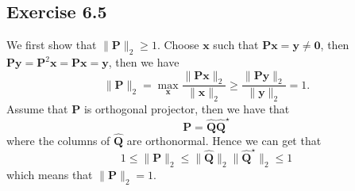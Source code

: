 \documentclass{article}
\begin{document}
\subsection{Exercise 6.5}
We first show that $\| \bm{P} \|_2 \geq 1$. Choose $\bm{x}$ such that $ \bm{Px} = \bm{y} \neq \bm{0}$, then $ \bm{P} \bm{y} = \bm{P}^2 \bm{x} = \bm{P} \bm{x} = \bm{y}$, then we have
$$
\| \bm{P} \|_2 = \max_{\bm{x} }  \frac{\| \bm{P x} \|_2}{ \| \bm{x} \|_2 } \geq \frac{\| \bm{P y} \|_2}{ \| \bm{y} \|_2 } = 1.
$$
Assume that $\bm{P} $ is orthogonal projector, then we have that
$$
\bm {P}  = \hat{\bm{Q}} \hat{\bm{Q}}^{\star}
$$
where the columns of $\hat{\bm{Q}}$ are orthonormal. Hence we can get that
$$
1\leq \| \bm{P} \|_2 \leq \|\hat{\bm{Q}} \|_2 \| \hat{\bm{Q}}^{\star}\|_2 \leq 1
$$
which means that $\| \bm{P} \|_2 = 1$. 
\end{document}
